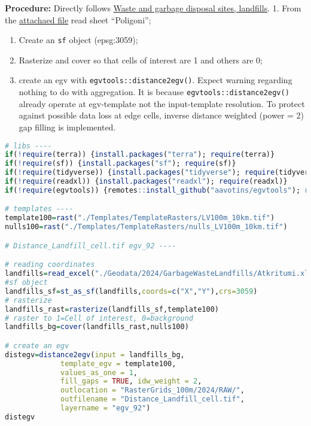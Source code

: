 \documentclass[
]{book}
\newcommand{\passthrough}[1]{#1}
\begin{document}
\textbf{Procedure:} Directly follows \hyperref[Ch04.14]{Waste and garbage disposal sites, landfills}.
1. From the \href{https://github.com/aavotins/HiQBioDiv_EGVs/blob/main/Data/Geodata/2024/GarbageWasteLandfills/Atkritumi.xlsx}{attachaed file} read sheet ``Poligoni'';

\begin{enumerate}
\def\labelenumi{\arabic{enumi}.}
\setcounter{enumi}{1}
\item
  Create an \passthrough{\lstinline!sf!} object (epsg:3059);
\item
  Rasterize and cover so that cells of interest are 1 and others are 0;
\item
  create an egv with \passthrough{\lstinline!egvtools::distance2egv()!}. Expect warning regarding nothing
  to do with aggregation. It is because \passthrough{\lstinline!egvtools::distance2egv()!} already operate at
  egv-template not the input-template resolution. To protect against possible data loss at edge cells,
  inverse distance weighted (power = 2) gap filling is implemented.
\end{enumerate}

\begin{lstlisting}[language=R]
# libs ----
if(!require(terra)) {install.packages("terra"); require(terra)}
if(!require(sf)) {install.packages("sf"); require(sf)}
if(!require(tidyverse)) {install.packages("tidyverse"); require(tidyverse)}
if(!require(readxl)) {install.packages("readxl"); require(readxl)}
if(!require(egvtools)) {remotes::install_github("aavotins/egvtools"); require(egvtools)}

# templates ----
template100=rast("./Templates/TemplateRasters/LV100m_10km.tif")
nulls100=rast("./Templates/TemplateRasters/nulls_LV100m_10km.tif")

# Distance_Landfill_cell.tif egv_92 ----

# reading coordinates
landfills=read_excel("./Geodata/2024/GarbageWasteLandfills/Atkritumi.xlsx",sheet="Poligoni")
#sf object
landfills_sf=st_as_sf(landfills,coords=c("X","Y"),crs=3059)
# rasterize
landfills_rast=rasterize(landfills_sf,template100)
# raster to 1=Cell of interest, 0=background
landfills_bg=cover(landfills_rast,nulls100)

# create an egv
distegv=distance2egv(input = landfills_bg,
             template_egv = template100,
             values_as_one = 1,
             fill_gaps = TRUE, idw_weight = 2,
             outlocation = "RasterGrids_100m/2024/RAW/",
             outfilename = "Distance_Landfill_cell.tif",
             layername = "egv_92")
distegv
\end{lstlisting}
\end{document}

